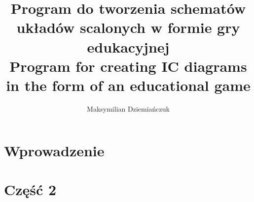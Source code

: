 \documentclass[12pt,twoside,a4paper]{report}
\title{\textbf{Program do tworzenia schematów układów scalonych w formie gry edukacyjnej}\\[2ex]
    \large Program for creating IC diagrams in the form of an educational game\\
}
\author{Maksymilian Dziemiańczuk}
\date{}
\begin{document}
\maketitle

\newpage

\tableofcontents

\chapter{Wprowadzenie}


\chapter{Część 2}



%
\end{document}
